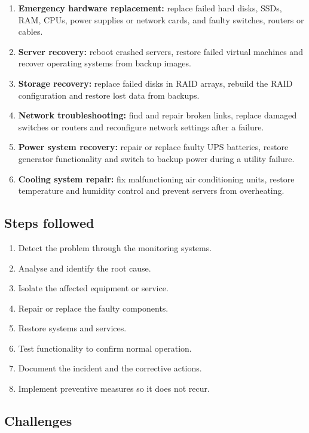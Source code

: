 \documentclass[11pt,a4paper]{article}
\begin{document}
\begin{enumerate}\itemsep3pt
  \item \textbf{Emergency hardware replacement:} replace failed hard disks, SSDs, RAM, CPUs,
        power supplies or network cards, and faulty switches, routers or cables.
  \item \textbf{Server recovery:} reboot crashed servers, restore failed virtual machines and
        recover operating systems from backup images.
  \item \textbf{Storage recovery:} replace failed disks in RAID arrays, rebuild the RAID
        configuration and restore lost data from backups.
  \item \textbf{Network troubleshooting:} find and repair broken links, replace damaged
        switches or routers and reconfigure network settings after a failure.
  \item \textbf{Power system recovery:} repair or replace faulty UPS batteries, restore
        generator functionality and switch to backup power during a utility failure.
  \item \textbf{Cooling system repair:} fix malfunctioning air conditioning units, restore
        temperature and humidity control and prevent servers from overheating.
\end{enumerate}

\subsection{Steps followed}

\begin{enumerate}\itemsep2pt
  \item Detect the problem through the monitoring systems.
  \item Analyse and identify the root cause.
  \item Isolate the affected equipment or service.
  \item Repair or replace the faulty components.
  \item Restore systems and services.
  \item Test functionality to confirm normal operation.
  \item Document the incident and the corrective actions.
  \item Implement preventive measures so it does not recur.
\end{enumerate}

\subsection{Challenges}
\end{document}
